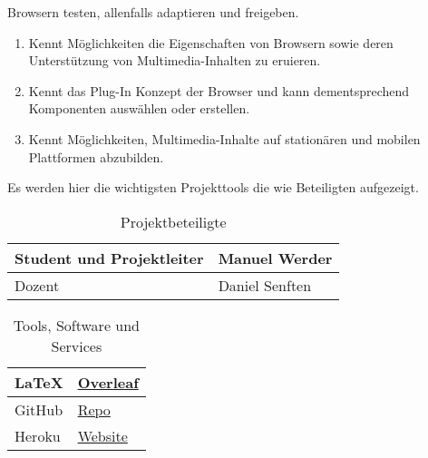 \begin{enumerate}
    Browsern testen, allenfalls adaptieren und freigeben.
    \begin{enumerate}
        \item Kennt Möglichkeiten die Eigenschaften von Browsern sowie deren Unterstützung von Multimedia-Inhalten zu eruieren.
        \item Kennt das Plug-In Konzept der Browser und kann dementsprechend Komponenten auswählen oder erstellen.
        \item Kennt Möglichkeiten, Multimedia-Inhalte auf stationären und mobilen Plattformen abzubilden.
    \end{enumerate}
\end{enumerate}

Es werden hier die wichtigsten Projekttools die wie Beteiligten aufgezeigt.

\begin{table}[h!]
    \centering
    \begin{tabularx}{0.8\textwidth} {
    | >{\raggedright\arraybackslash}X
    | >{\raggedright\arraybackslash}X | }
        \hline
        \sffamily Student und Projektleiter & \sffamily  Manuel Werder \\
        \hline
        \sffamily Dozent & \sffamily Daniel Senften  \\
        \hline
    \end{tabularx}
    \caption{\sffamily Projektbeteiligte}
    \label{tab:1}
\end{table}

\begin{table}[h!]
    \centering
    \begin{tabularx}{0.8\textwidth} {
        | >{\raggedright\arraybackslash}X
        | >{\raggedright\arraybackslash}X | }
        \hline
        \LaTeX & \sffamily \href{https://www.overleaf.com}{Overleaf} \\
        \hline
        \sffamily GitHub & \sffamily \href{https://github.com/SetManu/m152_manuel_werder}{Repo} \\
        \hline
        \sffamily Heroku & \sffamily \href{https://m152-manuel-werder.herokuapp.com}{Website} \\
        \hline
    \end{tabularx}
    \caption{\sffamily Tools, Software und Services}
    \label{tab:2}
\end{table}
